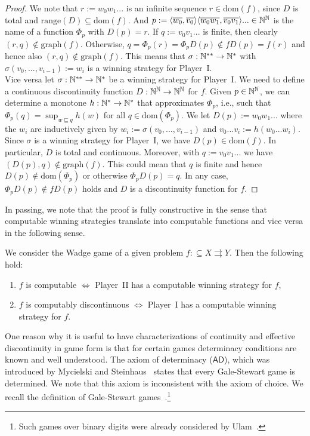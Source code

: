 \documentclass{amsart}
\def\IN{{\Bbb{N}}}
\def\In{\subseteq}
\def\prefix{\sqsubseteq}
\def\mto{\rightrightarrows}
\def\dom{{\mathrm{dom}}}
\def\range{{\mathrm{range}}}
\def\graph{{\mathrm{graph}}}
\def\AD{\mathsf{AD}}
\begin{document}
\begin{proof}
We note that $r:=w_0w_1...$ is an infinite sequence $r\in\dom(f)$,
since $D$ is total and $\range(D)\In\dom(f)$. And $p:=\langle\overline{w_0},\overline{v_0}\rangle\langle\overline{w_0w_{1}},\overline{v_0v_{1}}\rangle...\in\IN^\IN$
is the name of a function $\Phi_p$ with $D(p)=r$. 
If $q:=v_0v_1...$ is finite, then clearly $(r,q)\not\in\graph(f)$. Otherwise, $q=\Phi_p(r)=\Phi_pD(p)\not\in fD(p)=f(r)$
and hence also $(r,q)\not\in\graph(f)$. This means that $\sigma:\IN^{**}\to\IN^*$
with $\sigma(v_0,...,v_{i-1}):=w_i$ is a winning strategy for Player~I.\smallskip\\
Vice versa let  $\sigma:\IN^{**}\to\IN^*$ be a winning strategy for Player~I.
We need to define a continuous discontinuity function $D:\IN^\IN\to\IN^\IN$ for $f$.
Given $p\in\IN^\IN$, we can determine a monotone $h:\IN^*\to\IN^*$ that approximates $\Phi_p$, i.e., 
such that $\Phi_p(q)=\sup_{w\prefix q}h(w)$ for all $q\in\dom(\Phi_p)$. 
We let $D(p):=w_0w_1...$
where the $w_i$ are inductively given by $w_i:=\sigma(v_0,...,v_{i-1})$
and $v_0...v_i:=h(w_0...w_i)$.
Since $\sigma$ is a winning strategy for Player~I, we have $D(p)\in\dom(f)$. In particular, $D$ is total and continuous.
Moreover, with $q:=v_0v_1...$ we have $(D(p),q)\not\in\graph(f)$.
This could mean that $q$ is finite and hence $D(p)\not\in\dom(\Phi_p)$ 
or otherwise $\Phi_pD(p)=q$. In any case, $\Phi_pD(p)\not\in fD(p)$ holds and $D$ is a discontinuity function
for $f$.
\end{proof}

In passing, we note that the proof is fully constructive in the sense that computable winning strategies
translate into computable functions and vice versa in the following sense.

\begin{corollary}
\label{cor:Wadge-game}
We consider the Wadge game of a given problem ${f:\In X\mto Y}$.
Then the following hold:
\begin{enumerate}
\item $f$ is computable $\iff$ Player~II has a computable winning strategy for $f$,
\item $f$ is computably discontinuous $\iff$ Player~I has a computable winning strategy for $f$.
\end{enumerate}
\end{corollary}

One reason why it is useful to have characterizations of continuity and effective discontinuity
in game form is that for certain games determinacy conditions are known and well understood.
The axiom of determinacy ($\AD$), which was introduced by Mycielski and Steinhaus~\cite{MS62,Myc64} 
states that every Gale-Stewart game is determined.
We note that this axiom is inconsistent with the axiom of choice.
We recall the definition of Gale-Stewart games~\cite{Soa16}.\footnote{Such games over binary digits were already considered by Ulam~\cite{Tel87}.}
\end{document}
